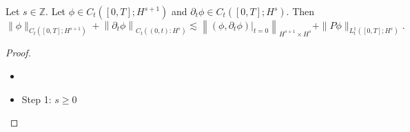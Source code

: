 \begin{proposition}
Let $s \in \mathbb{Z}$. Let $\phi \in C_{t}\left([0, T] ; H^{s+1}\right)$ and $\partial_{t} \phi \in C_{t}\left([0, T] ; H^{s}\right)$. Then
$$
\|\phi\|_{C_{t}\left([0, T] ; H^{s+1}\right)}+\left\|\partial_{t} \phi\right\|_{C_{t}\left((0, t): H^{s}\right)} \lesssim\left\|\left.\left(\phi, \partial_{t} \phi\right)\right|_{t=0}\right\|_{H^{s+1} \times H^{s}}+\|P \phi\|_{L_{t}^{1}\left([0, T] ; H^{s}\right)} .
$$
\end{proposition}
\begin{proof}
\begin{itemize}
    \item []
    \item 
    Step 1: $s\ge 0$ 
    

\end{itemize}
\end{proof}
